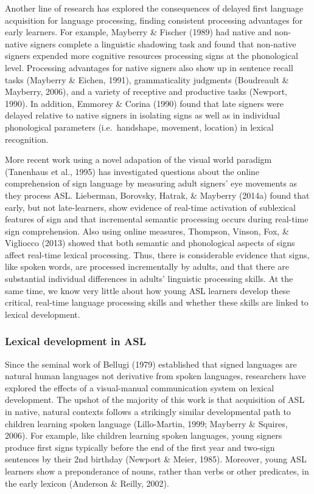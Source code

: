 \documentclass[12pt,]{article}
\begin{document}
Another line of research has explored the consequences of delayed first
language acquisition for language processing, finding consistent
processing advantages for early learners. For example, Mayberry \&
Fischer (1989) had native and non-native signers complete a linguistic
shadowing task and found that non-native signers expended more cognitive
resources processing signs at the phonological level. Processing
advantages for native signers also show up in sentence recall tasks
(Mayberry \& Eichen, 1991), grammaticality judgments (Boudreault \&
Mayberry, 2006), and a variety of receptive and productive tasks
(Newport, 1990). In addition, Emmorey \& Corina (1990) found that late
signers were delayed relative to native signers in isolating signs as
well as in individual phonological parameters (i.e.~handshape, movement,
location) in lexical recognition.

More recent work using a novel adapation of the visual world paradigm
(Tanenhaus et al., 1995) has investigated questions about the online
comprehension of sign language by measuring adult signers' eye movements
as they process ASL. Lieberman, Borovsky, Hatrak, \& Mayberry (2014a)
found that early, but not late-learners, show evidence of real-time
activation of sublexical features of sign and that incremental semantic
processing occurs during real-time sign comprehension. Also using online
measures, Thompson, Vinson, Fox, \& Vigliocco (2013) showed that both
semantic and phonological aspects of signs affect real-time lexical
processing. Thus, there is considerable evidence that signs, like spoken
words, are processed incrementally by adults, and that there are
substantial individual differences in adults' linguistic processing
skills. At the same time, we know very little about how young ASL
learners develop these critical, real-time language processing skills
and whether these skills are linked to lexical development.

\subsubsection{Lexical development in
ASL}\label{lexical-development-in-asl}

Since the seminal work of Bellugi (1979) established that signed
languages are natural human languages not derivative from spoken
languages, researchers have explored the effects of a visual-manual
communication system on lexical development. The upshot of the majority
of this work is that acquisition of ASL in native, natural contexts
follows a strikingly similar developmental path to children learning
spoken language (Lillo-Martin, 1999; Mayberry \& Squires, 2006). For
example, like children learning spoken languages, young signers produce
first signs typically before the end of the first year and two-sign
sentences by their 2nd birthday (Newport \& Meier, 1985). Moreover,
young ASL learners show a preponderance of nouns, rather than verbs or
other predicates, in the early lexicon (Anderson \& Reilly, 2002).
\end{document}
